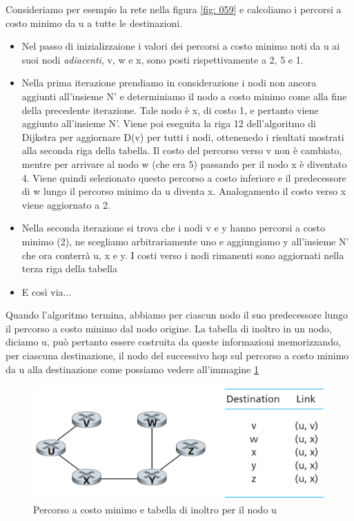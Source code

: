 \documentclass[11pt,a4paper]{article}
\begin{document}
Consideriamo per esempio la rete nella figura \ref{fig: 059} e calcoliamo i percorsi a costo minimo da u a tutte le destinazioni.
\begin{itemize}
	\item Nel passo di inizializzaione i valori dei percorsi a costo minimo noti da u ai suoi nodi \emph{adiacenti}, v, w e x, sono posti rispettivamente a 2, 5 e 1.
	\item Nella prima iterazione prendiamo in considerazione i nodi non ancora aggiunti all'insieme N' e determiniamo il nodo a costo minimo come alla fine della precedente iterazione. Tale nodo è x, di costo 1, e pertanto viene aggiunto all'insieme N'. Viene poi eseguita la riga 12 dell'algoritmo di Dijkstra per aggiornare D(v) per tutti i nodi, ottenenedo i risultati mostrati alla seconda riga della tabella. Il costo del percorso verso v non è cambiato, mentre per arrivare al nodo w (che era 5) passando per il nodo x è diventato 4. Viene quindi selezionato questo percorso a costo inferiore e il predecessore di w lungo il percorso minimo da u diventa x. Analogamento il costo verso x viene aggiornato a 2.
	\item Nella seconda iterazione si trova che i nodi v e y hanno percorsi a costo minimo (2), ne scegliamo arbitrariamente uno e aggiungiamo y all'insieme N' che ora conterrà u, x e y. I costi verso i nodi rimanenti sono aggiornati nella terza riga della tabella
	\item E così via...
\end{itemize}
Quando l'algoritmo termina, abbiamo per ciascun nodo il suo predecessore lungo il percorso a costo minimo dal nodo origine. La tabella di inoltro in un nodo, diciamo u, può pertanto essere costruita da queste informazioni memorizzando, per ciascuna destinazione, il nodo del successivo hop sul percorso a costo minimo da u alla destinazione come possiamo vedere all'immagine \ref{fig: 062}
\begin{figure}
	\includegraphics[scale=0.6]{img/062.png}
	\caption{Percorso a costo minimo e tabella di inoltro per il nodo u}
	\label{fig: 062}
\end{figure}
\end{document}
